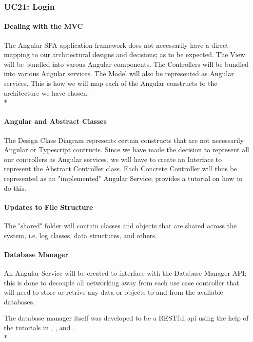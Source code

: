 \documentclass[11pt]{article}
\begin{document}
\subsubsection{UC21: Login}


\paragraph{Dealing with the MVC}
The Angular SPA application framework does not necessarily have a direct mapping to our architectural designs and decisions; as to be expected. The View will be bundled into varous Angular components. The Controllers will be bundled into various Angular services. The Model will also be represented as Angular services. This is how we will map each of the Angular constructs to the architecture we have chosen.\\*

\paragraph{Angular and Abstract Classes}
The Design Class Diagram represents certain constructs that are not necessarily Angular or Typescript contructs. Since we have made the decision to represent all our controllers as Angular services, we will have to create an Interface to represent the Abstract Controller class. Each Concrete Controller will thus be represented as an "implemented" Angular Service; \cite{Website:5} provides a tutorial on how to do this.

\paragraph{Updates to File Structure}
The "shared" folder will contain classes and objects  that are shared across the system, i.e. log classes, data structures, and others.\par

\paragraph{Database Manager}
An Angular Service will be created to interface with the Database Manager API; this is done to decouple all networking away from each use case controller that will need to store or retrive any data or objects to and from the available databases.\par
The database manager itself was developed to be a RESTful api using the help of the tutorials in \cite{Website:6}, \cite{Website:7}, and \cite{Website:8}.\\*
\end{document}

